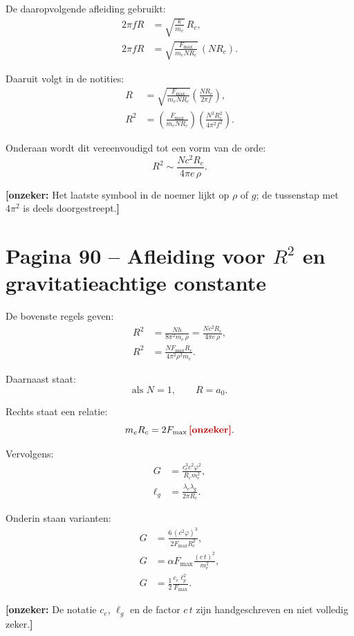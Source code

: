 \documentclass[11pt,a4paper]{article}
\newcommand{\onzeker}[1]{\ifmmode\text{\color{red!70!black}\bfseries[onzeker]}\else\textcolor{red!70!black}{\textbf{[onzeker:} #1\textbf{]}}\fi}
\begin{document}
De daaropvolgende afleiding gebruikt:
\begin{align*}
2\pi f R
&=
\sqrt{\frac{k}{m_e}}\,R_c,\\
2\pi f R
&=
\sqrt{\frac{F_{\max}}{m_e N R_c}}\,(N R_c).
\end{align*}

Daaruit volgt in de notities:
\begin{align*}
R
&=
\sqrt{\frac{F_{\max}}{m_e N R_c}}
\left(\frac{N R_c}{2\pi f}\right),\\
R^2
&=
\left(\frac{F_{\max}}{m_e N R_c}\right)
\left(\frac{N^2R_c^2}{4\pi^2 f^2}\right).
\end{align*}

Onderaan wordt dit vereenvoudigd tot een vorm van de orde:
\[
R^2
\sim
\frac{N c^2 R_c}{4\pi e\,\rho}.
\]

\onzeker{Het laatste symbool in de noemer lijkt op $\rho$ of $g$; de tussenstap met $4\pi^2$ is deels doorgestreept.}

\section*{Pagina 90 -- Afleiding voor $R^2$ en gravitatieachtige constante}

De bovenste regels geven:
\begin{align*}
R^2
&=
\frac{Nh}{8\pi^2 m_e\,\rho}
=
\frac{Nc^2R_c}{4\pi e\,\rho},\\
R^2
&=
\frac{N F_{\max}R_c}{4\pi^2\rho^2m_e}.
\end{align*}

Daarnaast staat:
\[
\text{als } N=1,\qquad R=a_0.
\]

Rechts staat een relatie:
\[
m_e R_c = 2F_{\max}\,\onzeker{C}.
\]

Vervolgens:
\begin{align*}
G
&=
\frac{c_e^{3}c^{2}\varphi^{2}}{R_c m_e^2},\\
\ell_g
&=
\frac{\lambda_e\lambda_g}{2\pi R_c}.
\end{align*}

Onderin staan varianten:
\begin{align*}
G
&=
\frac{6\,(c^{2}\varphi)^{3}}{2F_{\max}R_c^2},\\
G
&=
\alpha F_{\max}\frac{(c\,t)^{2}}{m_e^2},\\
G
&=
\frac{1}{2}\frac{c_e \ell_p^2}{F_{\max}}.
\end{align*}

\onzeker{De notatie $c_e$, $\ell_g$ en de factor $c\,t$ zijn handgeschreven en niet volledig zeker.}
\end{document}
